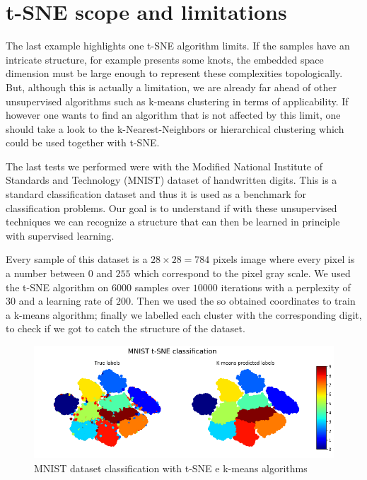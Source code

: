 \documentclass[%
 aip,
 jmp,%
 amsmath,amssymb,
 reprint,%
]{revtex4-1}
\begin{document}
\section{t-SNE scope and limitations}
The last example highlights one t-SNE algorithm limits. If the samples have
an intricate structure, for example presents some knots, the embedded space
dimension must be large enough to represent these complexities topologically.
But, although this is actually a limitation, we are already far ahead of
other unsupervised algorithms such as k-means clustering in terms of
applicability. If however one wants to find an algorithm that is not
affected by this limit, one should take a look to the k-Nearest-Neighbors
or  hierarchical clustering which could be used together with t-SNE.

The last tests we performed were with the Modified National Institute of
Standards and Technology (MNIST) dataset of handwritten digits. This
is a standard classification dataset and thus it is used as a benchmark
for classification problems. Our goal is to understand if with these %
unsupervised techniques we can recognize a structure that can then be
learned in principle with supervised learning.

Every sample of this dataset is a $28 \times 28 = 784$
pixels image where every pixel is a number between $0$ and $255$ which
correspond to the pixel gray scale. We used the t-SNE algorithm on
$6000$ samples over $10000$ iterations with a perplexity of $30$ and a
learning rate of $200$. Then we used the so obtained coordinates
to train a k-means algorithm; finally we labelled each cluster with the
corresponding digit, to check if we got to catch the structure of the
dataset. %


\begin{figure}[h]
 \includegraphics[scale=0.3]{images/MNIST.png}
 \caption{MNIST dataset classification with t-SNE e k-means algorithms}
 \label{fig:MNIST}
\end{figure}
\end{document}
